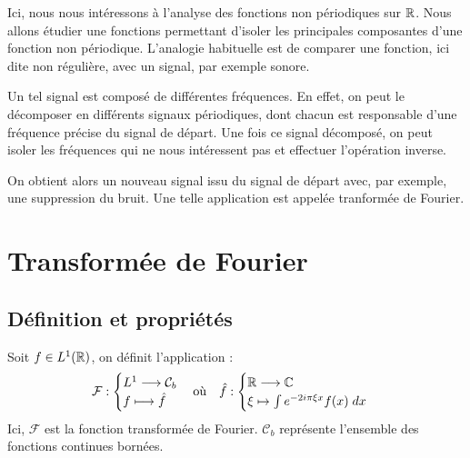 
Ici, nous nous intéressons à l'analyse des fonctions non périodiques sur $\mathbb{R}$. 
Nous allons étudier une fonctions permettant d'isoler les principales composantes d'une fonction non périodique. 
L'analogie habituelle est de comparer une fonction, ici dite non régulière, avec un signal, par exemple sonore. 

Un tel signal est composé de différentes fréquences. En effet, on peut le décomposer en différents signaux 
périodiques, dont chacun est responsable d'une fréquence précise du signal de départ. 
Une fois ce signal décomposé, on peut isoler les fréquences qui ne nous intéressent pas et effectuer l'opération inverse. 

On obtient alors un nouveau signal issu du signal de départ avec, par exemple, une suppression du bruit. 
Une telle application est appelée tranformée de Fourier. 

\section{Transformée de Fourier}

\subsection{Définition et propriétés}

\begin{definition}
    Soit $f \in L^1(\mathbb{R})$, on définit l'application :
        \[ \mathcal{F} : 
            \begin{cases}
                L^1 \longrightarrow \mathcal{C}_b \\
                f \longmapsto \hat{f} 
            \end{cases}
        \text{où} \quad 
        \hat{f} :
        \begin{cases}
            \mathbb{R} \longrightarrow \mathbb{C} \\
            \xi \mapsto \int e^{-2i\pi \xi x} f(x) \; dx 
        \end{cases}
        \]
    Ici, $\mathcal{F}$ est la fonction transformée de Fourier. $\mathcal{C}_b$ représente l'ensemble des fonctions continues bornées. 
\end{definition}

